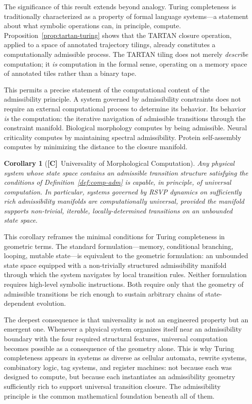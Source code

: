 \documentclass[11pt, oneside]{article}
\numberwithin{equation}{section}
\newcommand{\ClaimC}{\textcolor{rsvpgray!50}{\textbf{[C]}}}
\theoremstyle{rsvpstyle}
\newtheorem{corollary}[theorem]{Corollary}
\theoremstyle{remark}
\begin{document}
The significance of this result extends beyond analogy. Turing completeness is
traditionally characterized as a property of formal language systems---a statement
about what symbolic operations can, in principle, compute. Proposition~\ref{prop:tartan-turing}
shows that the TARTAN closure operation, applied to a space of annotated trajectory
tilings, already constitutes a computationally admissible process. The TARTAN tiling
does not merely \emph{describe} computation; it \emph{is} computation in the formal
sense, operating on a memory space of annotated tiles rather than a binary tape.

This permits a precise statement of the computational content of the admissibility
principle. A system governed by admissibility constraints does not require an external
computational process to determine its behavior. Its behavior \emph{is} the computation:
the iterative navigation of admissible transitions through the constraint manifold.
Biological morphology computes by being admissible. Neural criticality computes by
maintaining spectral admissibility. Protein self-assembly computes by minimizing the
distance to the closure manifold.

\begin{corollary}[\ClaimC\ Universality of Morphological Computation]
\label{cor:morphological-turing}
Any physical system whose state space contains an admissible transition structure
satisfying the conditions of Definition~\ref{def:comp-adm} is capable, in principle,
of universal computation. In particular, systems governed by RSVP dynamics on sufficiently
rich admissibility manifolds are computationally universal, provided the manifold
supports non-trivial, iterable, locally-determined transitions on an unbounded state space.
\end{corollary}

This corollary reframes the minimal conditions for Turing completeness in geometric
terms. The standard formulation---memory, conditional branching, looping, mutable
state---is equivalent to the geometric formulation: an unbounded state space equipped
with a non-trivially structured admissibility manifold through which the system navigates
by local transition rules. Neither formulation requires high-level symbolic instructions.
Both require only that the geometry of admissible transitions be rich enough to sustain
arbitrary chains of state-dependent evolution.

The deepest consequence is that universality is not an engineered property but an
emergent one. Whenever a physical system organizes itself near an admissibility boundary
with the four required structural features, universal computation becomes possible as a
consequence of the geometry alone. This is why Turing completeness appears in systems
as diverse as cellular automata, rewrite systems, combinatory logic, tag systems, and
register machines: not because each was designed to compute, but because each
instantiates an admissibility geometry sufficiently rich to support universal transition
closure. The admissibility principle is the common mathematical foundation beneath all
of them.
\end{document}
